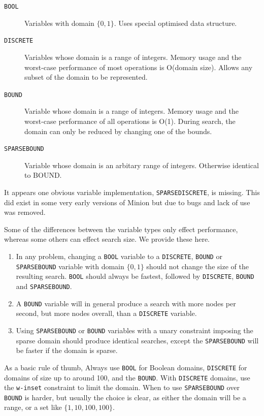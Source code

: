 \documentclass[oneside]{book}
\newcommand{\BOOL}{\texttt{BOOL}\xspace}
\newcommand{\DISCRETE}{\texttt{DISCRETE}\xspace}
\newcommand{\BOUND}{\texttt{BOUND}\xspace}
\newcommand{\SPARSEBOUND}{\texttt{SPARSEBOUND}\xspace}
\begin{document}
\begin{description}
\item[\BOOL] Variables with domain \(\{0,1\}\). Uses special optimised data structure.
\item[\DISCRETE] Variables whose domain is a range of integers. Memory usage and the worst-case performance of most operations is O(domain size). Allows any subset of the domain to be represented.
\item[\BOUND] Variable whose domain is a range of integers. Memory usage and the worst-case performance of all operations is O(1). During search, the domain can only be reduced by changing one of the bounds.
\item[\SPARSEBOUND] Variable whose domain is an arbitary range of integers. Otherwise identical to BOUND.
\end{description}

It appears one obvious variable implementation, \texttt{SPARSEDISCRETE}, is missing. This did exist in some very early versions of Minion but due to bugs and lack of use was removed. 

Some of the differences between the variable types only effect performance, whereas some others can effect search size. We provide these here.

\begin{enumerate}
\item In any problem, changing a \BOOL variable to a \DISCRETE, \BOUND or \SPARSEBOUND variable with domain \(\{0,1\}\) should not change the size of the resulting search. \BOOL should always be fastest, followed by \DISCRETE, \BOUND and \SPARSEBOUND.

\item A \BOUND variable will in general produce a search with more nodes per second, but more nodes overall, than a \DISCRETE variable.

\item Using \SPARSEBOUND or \BOUND variables with a unary constraint imposing the sparse domain should produce identical searches, except the \SPARSEBOUND will be faster if the domain is sparse. 
\end{enumerate}

As a basic rule of thumb, Always use \BOOL for Boolean domains, \DISCRETE for domains of size up to around 100, and the \BOUND. With \DISCRETE domains, use the \texttt{w-inset} constraint to limit the domain. When to use \SPARSEBOUND over \BOUND is harder, but usually the choice is clear, as either the domain will be a range, or a set like \(\{1,10,100,100\}\).
\end{document}
